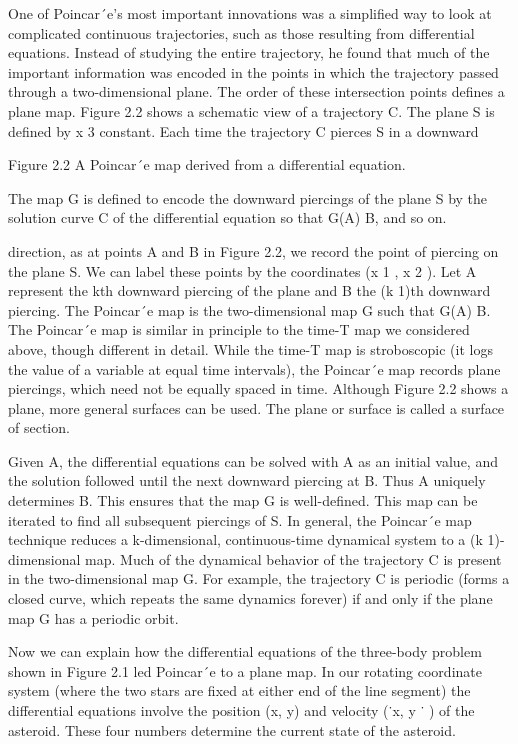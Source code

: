 \documentclass[12pt]{article}
\begin{document}
One of Poincar´e’s most important innovations was a simpliﬁed way to look at complicated continuous trajectories, such as those 
resulting from differential equations. Instead of studying the entire trajectory, he found that much of the important information was 
encoded in the points in which the trajectory passed through a two-dimensional plane. The order of these intersection points deﬁnes 
a plane map. Figure 2.2 shows a schematic view of a trajectory C. The plane S is deﬁned by x 3  constant. Each time the trajectory C 
pierces S in a downward

Figure 2.2 A Poincar´e map derived from a differential equation.

The map G is deﬁned to encode the downward piercings of the plane S by the solution curve C of the differential equation so that 
G(A)  B, and so on.

direction, as at points A and B in Figure 2.2, we record the point of piercing on the plane S. We can label these points by the 
coordinates (x 1 , x 2 ). Let A represent the kth downward piercing of the plane and B the (k  1)th downward piercing. The Poincar´e 
map is the two-dimensional map G such that G(A)  B. The Poincar´e map is similar in principle to the time-T map we considered above, 
though different in detail. While the time-T map is stroboscopic (it logs the value of a variable at equal time intervals), the 
Poincar´e map records plane piercings, which need not be equally spaced in time. Although Figure 2.2 shows a plane, more general 
surfaces can be used. The plane or surface is called a surface of section.

Given A, the differential equations can be solved with A as an initial value, and the solution followed until the next downward 
piercing at B. Thus A uniquely determines B. This ensures that the map G is well-deﬁned. This map can be iterated to ﬁnd all 
subsequent piercings of S. In general, the Poincar´e map technique reduces a k-dimensional, continuous-time dynamical system to a (k  
1)-dimensional map. Much of the dynamical behavior of the trajectory C is present in the two-dimensional map G. For example, the 
trajectory C is periodic (forms a closed curve, which repeats the same dynamics forever) if and only if the plane map G has a 
periodic orbit.

Now we can explain how the differential equations of the three-body problem shown in Figure 2.1 led Poincar´e to a plane map. In our 
rotating coordinate system (where the two stars are ﬁxed at either end of the line segment) the differential equations involve the 
position (x, y) and 
velocity (˙x, y ˙ ) of the asteroid. These four numbers determine the current state of the asteroid.
\end{document}
